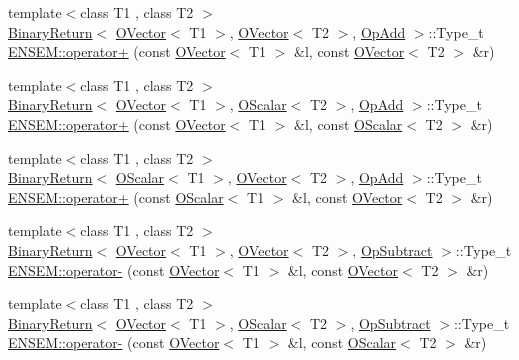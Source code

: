 \begin{DoxyCompactItemize}
{\footnotesize template$<$class T1 , class T2 $>$ }\\\mbox{\hyperlink{structENSEM_1_1BinaryReturn}{Binary\+Return}}$<$ \mbox{\hyperlink{classENSEM_1_1OVector}{O\+Vector}}$<$ T1 $>$, \mbox{\hyperlink{classENSEM_1_1OVector}{O\+Vector}}$<$ T2 $>$, \mbox{\hyperlink{structENSEM_1_1OpAdd}{Op\+Add}} $>$\+::Type\+\_\+t \mbox{\hyperlink{group__obsvector_gab0356c94496b2d6ffd11e6e595df0ea8}{E\+N\+S\+E\+M\+::operator+}} (const \mbox{\hyperlink{classENSEM_1_1OVector}{O\+Vector}}$<$ T1 $>$ \&l, const \mbox{\hyperlink{classENSEM_1_1OVector}{O\+Vector}}$<$ T2 $>$ \&r)
\item 
{\footnotesize template$<$class T1 , class T2 $>$ }\\\mbox{\hyperlink{structENSEM_1_1BinaryReturn}{Binary\+Return}}$<$ \mbox{\hyperlink{classENSEM_1_1OVector}{O\+Vector}}$<$ T1 $>$, \mbox{\hyperlink{classENSEM_1_1OScalar}{O\+Scalar}}$<$ T2 $>$, \mbox{\hyperlink{structENSEM_1_1OpAdd}{Op\+Add}} $>$\+::Type\+\_\+t \mbox{\hyperlink{group__obsvector_gaff6b0407180422eb54c7c31f17d340e3}{E\+N\+S\+E\+M\+::operator+}} (const \mbox{\hyperlink{classENSEM_1_1OVector}{O\+Vector}}$<$ T1 $>$ \&l, const \mbox{\hyperlink{classENSEM_1_1OScalar}{O\+Scalar}}$<$ T2 $>$ \&r)
\item 
{\footnotesize template$<$class T1 , class T2 $>$ }\\\mbox{\hyperlink{structENSEM_1_1BinaryReturn}{Binary\+Return}}$<$ \mbox{\hyperlink{classENSEM_1_1OScalar}{O\+Scalar}}$<$ T1 $>$, \mbox{\hyperlink{classENSEM_1_1OVector}{O\+Vector}}$<$ T2 $>$, \mbox{\hyperlink{structENSEM_1_1OpAdd}{Op\+Add}} $>$\+::Type\+\_\+t \mbox{\hyperlink{group__obsvector_ga19b9d8af56a96f2d3b3455fe4ec1f98f}{E\+N\+S\+E\+M\+::operator+}} (const \mbox{\hyperlink{classENSEM_1_1OScalar}{O\+Scalar}}$<$ T1 $>$ \&l, const \mbox{\hyperlink{classENSEM_1_1OVector}{O\+Vector}}$<$ T2 $>$ \&r)
\item 
{\footnotesize template$<$class T1 , class T2 $>$ }\\\mbox{\hyperlink{structENSEM_1_1BinaryReturn}{Binary\+Return}}$<$ \mbox{\hyperlink{classENSEM_1_1OVector}{O\+Vector}}$<$ T1 $>$, \mbox{\hyperlink{classENSEM_1_1OVector}{O\+Vector}}$<$ T2 $>$, \mbox{\hyperlink{structENSEM_1_1OpSubtract}{Op\+Subtract}} $>$\+::Type\+\_\+t \mbox{\hyperlink{group__obsvector_ga928e3f4f9c8ac492925b3d1a78d11216}{E\+N\+S\+E\+M\+::operator-\/}} (const \mbox{\hyperlink{classENSEM_1_1OVector}{O\+Vector}}$<$ T1 $>$ \&l, const \mbox{\hyperlink{classENSEM_1_1OVector}{O\+Vector}}$<$ T2 $>$ \&r)
\item 
{\footnotesize template$<$class T1 , class T2 $>$ }\\\mbox{\hyperlink{structENSEM_1_1BinaryReturn}{Binary\+Return}}$<$ \mbox{\hyperlink{classENSEM_1_1OVector}{O\+Vector}}$<$ T1 $>$, \mbox{\hyperlink{classENSEM_1_1OScalar}{O\+Scalar}}$<$ T2 $>$, \mbox{\hyperlink{structENSEM_1_1OpSubtract}{Op\+Subtract}} $>$\+::Type\+\_\+t \mbox{\hyperlink{group__obsvector_ga99ab390926e54bd5fb8ad9265047f9cb}{E\+N\+S\+E\+M\+::operator-\/}} (const \mbox{\hyperlink{classENSEM_1_1OVector}{O\+Vector}}$<$ T1 $>$ \&l, const \mbox{\hyperlink{classENSEM_1_1OScalar}{O\+Scalar}}$<$ T2 $>$ \&r)

\end{DoxyCompactItemize}
